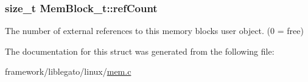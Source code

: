 \subsubsection[{\texorpdfstring{ref\+Count}{refCount}}]{\setlength{\rightskip}{0pt plus 5cm}size\+\_\+t Mem\+Block\+\_\+t\+::ref\+Count}\hypertarget{struct_mem_block__t_a7ef3e21f8e3a69b45bfeba1d89ca2737}{}\label{struct_mem_block__t_a7ef3e21f8e3a69b45bfeba1d89ca2737}
The number of external references to this memory block\textquotesingle{}s user object. (0 = free) 

The documentation for this struct was generated from the following file\+:\begin{DoxyCompactItemize}
\item 
framework/liblegato/linux/\hyperlink{mem_8c}{mem.\+c}\end{DoxyCompactItemize}
